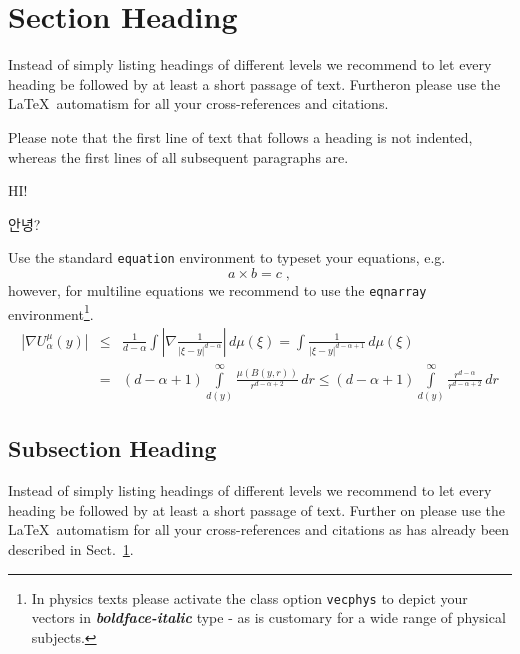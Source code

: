 \section{Section Heading}
\label{sec:2}
Instead of simply listing headings of different levels we recommend to let every heading be followed by at least a short passage of text. Furtheron please use the \LaTeX\ automatism for all your cross-references and citations.

Please note that the first line of text that follows a heading is not indented, whereas the first lines of all subsequent paragraphs are.

HI!

안녕?
\eject

Use the standard \verb|equation| environment to typeset your equations, e.g.
%
\begin{equation}
a \times b = c\;,
\end{equation}
%
however, for multiline equations we recommend to use the \verb|eqnarray| environment\footnote{In physics texts please activate the class option \texttt{vecphys} to depict your vectors in \textbf{\itshape boldface-italic} type - as is customary for a wide range of physical subjects.}.
\begin{eqnarray}
\left|\nabla U_{\alpha}^{\mu}(y)\right| &\le&\frac1{d-\alpha}\int
\left|\nabla\frac1{|\xi-y|^{d-\alpha}}\right|\,d\mu(\xi) =
\int \frac1{|\xi-y|^{d-\alpha+1}} \,d\mu(\xi)\qquad  \\
&=&(d-\alpha+1) \int\limits_{d(y)}^\infty
\frac{\mu(B(y,r))}{r^{d-\alpha+2}}\,dr \le (d-\alpha+1)
\int\limits_{d(y)}^\infty \frac{r^{d-\alpha}}{r^{d-\alpha+2}}\,dr
\label{eq:01}
\end{eqnarray}

\enlargethispage{24pt}

\subsection{Subsection Heading}
\label{subsec:2}
Instead of simply listing headings of different levels we recommend to let every heading be followed by at least a short passage of text. Further on please use the \LaTeX\ automatism for all your cross-references and citations as has already been described in Sect.~\ref{sec:2}.

